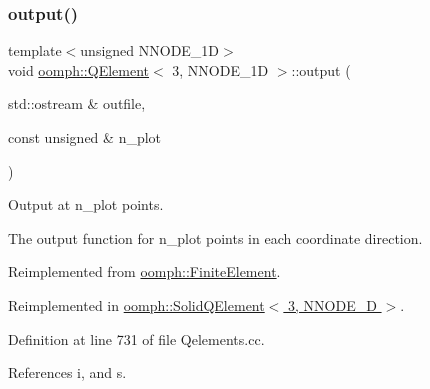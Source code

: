\mbox{\label{classoomph_1_1QElement_3_013_00_01NNODE__1D_01_4_a7023719931a1aa50096f1eeee34d173e}} 
\subsubsection{\texorpdfstring{output()}{output()}\hspace{0.1cm}{\footnotesize\ttfamily [2/4]}}
{\footnotesize\ttfamily template$<$unsigned N\+N\+O\+D\+E\+\_\+1D$>$ \\
void \hyperlink{classoomph_1_1QElement}{oomph\+::\+Q\+Element}$<$ 3, N\+N\+O\+D\+E\+\_\+1D $>$\+::output (\begin{DoxyParamCaption}\item[{std\+::ostream \&}]{outfile,  }\item[{const unsigned \&}]{n\+\_\+plot }\end{DoxyParamCaption})\hspace{0.3cm}{\ttfamily [virtual]}}



Output at n\+\_\+plot points. 

The output function for n\+\_\+plot points in each coordinate direction. 

Reimplemented from \hyperlink{classoomph_1_1FiniteElement_afa9d9b2670f999b43e6679c9dd28c457}{oomph\+::\+Finite\+Element}.



Reimplemented in \hyperlink{classoomph_1_1SolidQElement_3_013_00_01NNODE__1D_01_4_ac3ad47275d4cf27cd0ec0b7ec1c1f369}{oomph\+::\+Solid\+Q\+Element$<$ 3, N\+N\+O\+D\+E\+\_\+D $>$}.



Definition at line 731 of file Qelements.\+cc.



References i, and s.

\mbox{\label{classoomph_1_1QElement_3_013_00_01NNODE__1D_01_4_a8fa9ec0d0b74e734fc7d4066145c392b}} 
